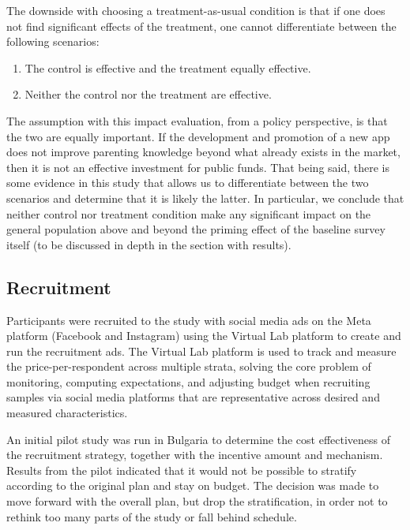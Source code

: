 \documentclass{article}
\begin{document}
The downside with choosing a treatment-as-usual condition is that if one does not find significant effects of the treatment, one cannot differentiate between the following scenarios:

\begin{enumerate}
    \item The control is effective and the treatment equally effective.
    \item Neither the control nor the treatment are effective.
\end{enumerate}

The assumption with this impact evaluation, from a policy perspective, is that the two are equally important. If the development and promotion of a new app does not improve parenting knowledge beyond what already exists in the market, then it is not an effective investment for public funds. That being said, there is some evidence in this study that allows us to differentiate between the two scenarios and determine that it is likely the latter. In particular, we conclude that neither control nor treatment condition make any significant impact on the general population above and beyond the priming effect of the baseline survey itself (to be discussed in depth in the section with results).

\subsection*{Recruitment}

Participants were recruited to the study with social media ads on the Meta platform (Facebook and Instagram) using the Virtual Lab platform to create and run the recruitment ads. The Virtual Lab platform is used to track and measure the price-per-respondent across multiple strata, solving the core problem of monitoring, computing expectations, and adjusting budget when recruiting samples via social media platforms that are representative across desired and measured characteristics.

An initial pilot study was run in Bulgaria to determine the cost effectiveness of the recruitment strategy, together with the incentive amount and mechanism. Results from the pilot indicated that it would not be possible to stratify according to the original plan and stay on budget. The decision was made to move forward with the overall plan, but drop the stratification, in order not to rethink too many parts of the study or fall behind schedule.
\end{document}
